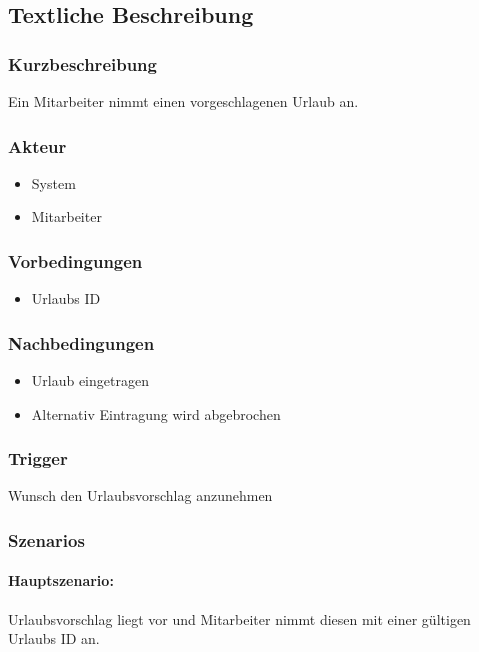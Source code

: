 \subsection{Textliche Beschreibung}

\subsubsection{Kurzbeschreibung}
Ein Mitarbeiter nimmt einen vorgeschlagenen Urlaub an.

\subsubsection{Akteur}
\begin{itemize}
	\item System
	\item Mitarbeiter
\end{itemize}

\subsubsection{Vorbedingungen}
\begin{itemize}
	\item Urlaubs ID
\end{itemize}

\subsubsection{Nachbedingungen}
\begin{itemize}
	\item Urlaub eingetragen
	\item Alternativ Eintragung wird abgebrochen
\end{itemize}

\subsubsection{Trigger}
Wunsch den Urlaubsvorschlag anzunehmen

\subsubsection{Szenarios}
\paragraph{Hauptszenario:}
Urlaubsvorschlag liegt vor und Mitarbeiter nimmt diesen mit einer gültigen Urlaubs ID an.

